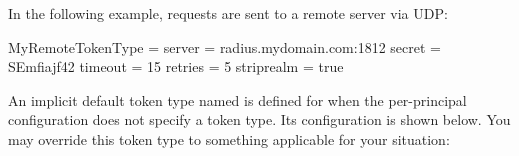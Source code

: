 \documentclass[letterpaper,10pt,english]{sphinxmanual}
\begin{document}
In the following example, requests are sent to a remote server via UDP:

%
\begin{sphinxVerbatim}[commandchars=\\\{\}]
[otp]
    MyRemoteTokenType = \PYGZob{}
        server = radius.mydomain.com:1812
        secret = SEmfiajf42\PYGZdl{}
        timeout = 15
        retries = 5
        strip\PYGZus{}realm = true
    \PYGZcb{}
\end{sphinxVerbatim}

An implicit default token type named  is defined for when
the per-principal configuration does not specify a token type.  Its
configuration is shown below.  You may override this token type to
something applicable for your situation:

%
\begin{sphinxVerbatim}[commandchars=\\\{\}]
\PYG{p}{[}\PYG{p}{]}
      
          
\end{sphinxVerbatim}
\end{document}

